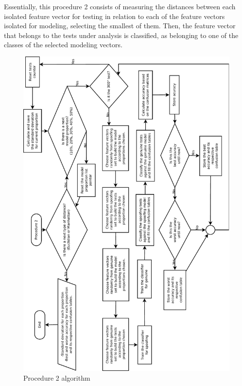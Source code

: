 			\par Essentially, this procedure 2 consists of measuring the distances between each isolated feature vector for testing in relation to each of the feature vectors isolated for modeling, selecting the smallest of them. Then, the feature vector that belongs to the tests under analysis is classified, as belonging to one of the classes of the selected modeling vectors.

			
			
			\begin{figure}[H]
				\centering
				\includegraphics[angle=-90,width=1\linewidth]{images/AlgoProcedure02.pdf}
				\caption{Procedure 2 algorithm}
				\label{fig:experiment02Algo}
			\end{figure}
			
